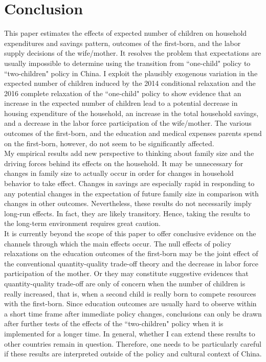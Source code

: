 \documentclass[12pt]{extarticle}
\begin{document}
\section{Conclusion}
This paper estimates the effects of expected number of children on household expenditures and savings pattern, outcomes of the first-born, and the labor supply decisions of the wife/mother. It resolves the problem that expectations are usually impossible to determine using the transition from ``one-child" policy to ``two-children" policy in China. I exploit the plausibly exogenous variation in the expected number of children induced by the 2014 conditional relaxation and the 2016 complete relaxation of the ``one-child" policy to show evidence that an increase in the expected number of children lead to a potential decrease in housing expenditure of the household, an increase in the total household savings, and a decrease in the labor force participation of the wife/mother. The various outcomes of the first-born, and the education and medical expenses parents spend on the first-born, however, do not seem to be significantly affected. \\
\indent My empirical results add new perspective to thinking about family size and the driving forces behind its effects on the household. It may be unnecessary for changes in family size to actually occur in order for changes in household behavior to take effect. Changes in savings are especially rapid in responding to any potential changes in the expectation of future family size in comparison with changes in other outcomes. Nevertheless, these results do not necessarily imply long-run effects. In fact, they are likely transitory. Hence, taking the results to the long-term environment requires great caution. \\
\indent It is currently beyond the scope of this paper to offer conclusive evidence on the channels through which the main effects occur. The null effects of policy relaxations on the education outcomes of the first-born may be the joint effect of the conventional quantity-quality trade-off theory and the decrease in labor force participation of the mother. Or they may constitute suggestive evidences that quantity-quality trade-off are only of concern when the number of children is really increased, that is, when a second child is really born to compete resources with the first-born. Since education outcomes are usually hard to observe within a short time frame after immediate policy changes, conclusions can only be drawn after further tests of the effects of the ``two-children" policy when it is implemented for a longer time. In general, whether I can extend these results to other countries remain in question. Therefore, one needs to be particularly careful if these results are interpreted outside of the policy and cultural context of China. \\
\end{document}
